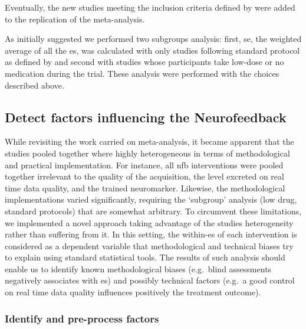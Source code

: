 Eventually, the new studies meeting the inclusion criteria defined by \citeauthor{Cortese2016} were added to the replication of the meta-analysis. 

As initially suggested we performed two subgroups analysis: first, \gls{se}, the weighted average of all the \gls{es}, was calculated with only studies following 
standard protocol as defined by \citet{Arns2014} and second with studies whose participants take low-dose or no medication during the trial. 
These analysis were performed with the choices described above. 

\subsection{Detect factors influencing the Neurofeedback}

While revisiting the work carried on meta-analysis, it became apparent that the studies pooled together where highly heterogeneous 
in terms of methodological and practical implementation. For instance, all \gls{nfb} interventions were pooled together irrelevant to the 
quality of the acquisition, the level excreted on real time data quality, and the trained neuromarker. 
Likewise, the methodological implementations varied significantly, requiring the `subgroup' analysis (low drug, standard protocols) 
that are somewhat arbitrary. To circumvent these limitations, we implemented a novel approach taking advantage of the studies heterogeneity 
rather than suffering from it. In this setting, the within-\gls{es} of each intervention is considered as a dependent variable that
methodological and technical biases try to explain using standard statistical tools. The results of such analysis should enable us to identify 
known methodological biases (e.g.\ blind assessments negatively associates with \gls{es}) 
and possibly technical factors (e.g.\ a good control on real time data quality influences positively the treatment outcome). 

\subsubsection{Identify and pre-process factors}

